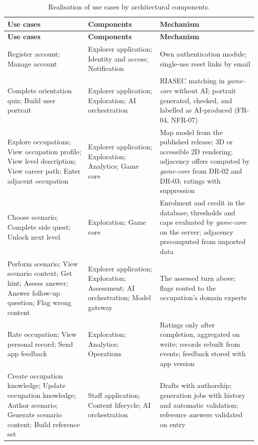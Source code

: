 {\small
\begin{longtable}{|>{\raggedright\arraybackslash}p{}|>{\raggedright\arraybackslash}p{}|>{\raggedright\arraybackslash}p{}|}
\caption{Realisation of use cases by architectural components.} \\
\hline
\textbf{Use cases} & \textbf{Components} & \textbf{Mechanism} \\ \hline
\endfirsthead
\hline
\textbf{Use cases} & \textbf{Components} & \textbf{Mechanism} \\ \hline
\endhead
Register account; Manage account & Explorer application; Identity and access; Notification & Own authentication module; single-use reset links by email \\ \hline
Complete orientation quiz; Build user portrait & Explorer application; Exploration; AI orchestration & RIASEC matching in \textit{game-core} without AI; portrait generated, checked, and labelled as AI-produced (FR-04, NFR-07) \\ \hline
Explore occupations; View occupation profile; View level description; View career path; Enter adjacent occupation & Explorer application; Exploration; Analytics; Game core & Map model from the published release; 3D or accessible 2D rendering; adjacency offers computed by \textit{game-core} from DR-02 and DR-03; ratings with suppression \\ \hline
Choose scenario; Complete side quest; Unlock next level & Exploration; Game core & Enrolment and credit in the database; thresholds and caps evaluated by \textit{game-core} on the server; adjacency precomputed from imported data \\ \hline
Perform scenario; View scenario context; Get hint; Assess answer; Answer follow-up question; Flag wrong content & Explorer application; Exploration; Assessment; AI orchestration; Model gateway & The assessed turn above; flags routed to the occupation's domain experts \\ \hline
Rate occupation; View personal record; Send app feedback & Exploration; Analytics; Operations & Ratings only after completion, aggregated on write; records rebuilt from events; feedback stored with app version \\ \hline
Create occupation knowledge; Update occupation knowledge; Author scenario; Generate scenario content; Build reference set & Staff application; Content lifecycle; AI orchestration & Drafts with authorship; generation jobs with history and automatic validation; reference answers validated on entry \\ \hline

\end{longtable}}
